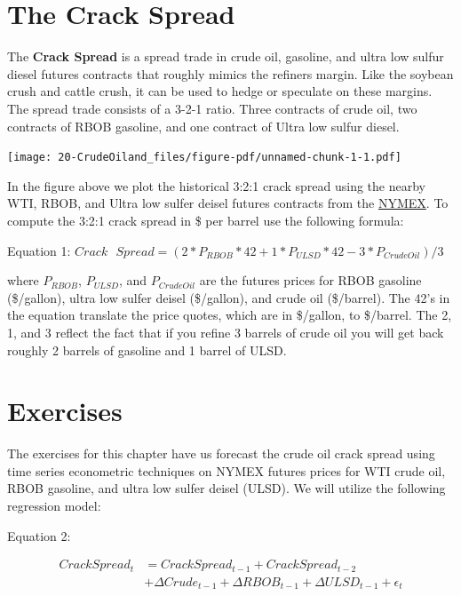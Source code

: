 \documentclass[
  letterpaper,
  DIV=11,
  numbers=noendperiod]{scrreprt}
\begin{document}
\hypertarget{the-crack-spread}{%
\section{The Crack Spread}\label{the-crack-spread}}

The \textbf{Crack Spread} is a spread trade in crude oil, gasoline, and
ultra low sulfur diesel futures contracts that roughly mimics the
refiners margin. Like the soybean crush and cattle crush, it can be used
to hedge or speculate on these margins. The spread trade consists of a
3-2-1 ratio. Three contracts of crude oil, two contracts of RBOB
gasoline, and one contract of Ultra low sulfur diesel.

\texttt{[image: 20-CrudeOiland\_files/figure-pdf/unnamed-chunk-1-1.pdf]}

In the figure above we plot the historical 3:2:1 crack spread using the
nearby WTI, RBOB, and Ultra low sulfer deisel futures contracts from the
\href{www.NYMEX.com}{NYMEX}. To compute the 3:2:1 crack spread in \$ per
barrel use the following formula:

Equation 1:
\(Crack \text{ } Spread = (2*P_{RBOB}*42 + 1*P_{ULSD}*42 - 3*P_{CrudeOil})/3\)

where \(P_{RBOB}\), \(P_{ULSD}\), and \(P_{CrudeOil}\) are the futures
prices for RBOB gasoline (\$/gallon), ultra low sulfer deisel
(\$/gallon), and crude oil (\$/barrel). The 42's in the equation
translate the price quotes, which are in \$/gallon, to \$/barrel. The 2,
1, and 3 reflect the fact that if you refine 3 barrels of crude oil you
will get back roughly 2 barrels of gasoline and 1 barrel of ULSD.

\hypertarget{exercises-8}{%
\section{Exercises}\label{exercises-8}}

The exercises for this chapter have us forecast the crude oil crack
spread using time series econometric techniques on NYMEX futures prices
for WTI crude oil, RBOB gasoline, and ultra low sulfer deisel (ULSD). We
will utilize the following regression model:

Equation 2:

\begin{align}
Crack Spread_t &= Crack Spread_{t-1} + Crack Spread_{t-2}    \\
                  & + \Delta Crude_{t-1} + \Delta RBOB_{t-1} + \Delta ULSD_{t-1} + \epsilon_t
\end{align}
\end{document}

